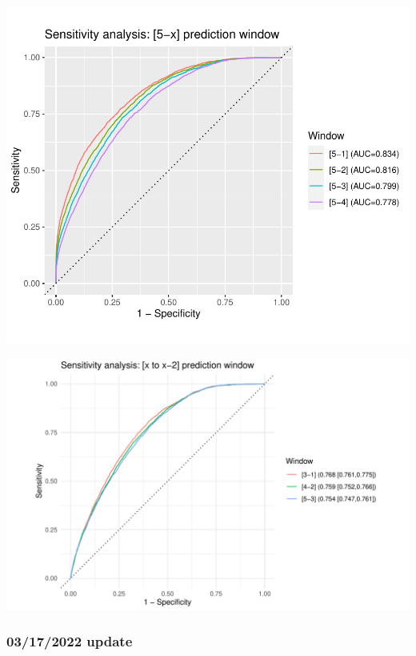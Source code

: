 \documentclass[12pt]{article}
\begin{document}
\begin{center}
\includegraphics[width=\textwidth]{figures/roc_window_5-x.pdf}
\end{center}
\begin{center}
\includegraphics[width=\textwidth]{figures/roc_window_2.pdf}
\end{center}




\pagebreak
\subsubsection*{03/17/2022 update}
\end{document}
